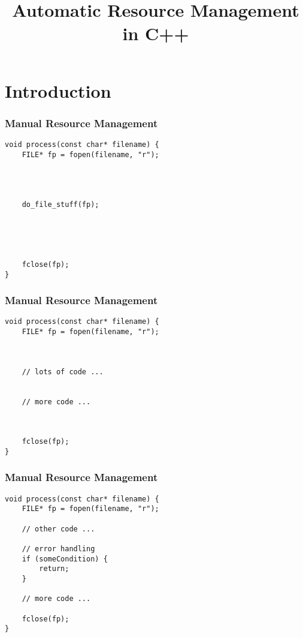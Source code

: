 


\title{Automatic Resource Management in C++}





\frame{\titlepage}

\section{Introduction}
\frame{\sectionpage}

\begin{frame}[fragile]
    \frametitle{Manual Resource Management}
    \begin{lstlisting}[title=See anything wrong?]
void process(const char* filename) {
    FILE* fp = fopen(filename, "r");




    do_file_stuff(fp);





    fclose(fp);
}
    \end{lstlisting}
\end{frame}

\begin{frame}[fragile]
    \frametitle{Manual Resource Management}
    \begin{lstlisting}[title=See anything wrong?]
void process(const char* filename) {
    FILE* fp = fopen(filename, "r");



    // lots of code ...


    // more code ...



    fclose(fp);
}
    \end{lstlisting}
\end{frame}

\begin{frame}[fragile]
    \frametitle{Manual Resource Management}
    \begin{lstlisting}[title=Forgetting to close!]
void process(const char* filename) {
    FILE* fp = fopen(filename, "r");

    // other code ...

    // error handling
    if (someCondition) {
        return;
    }

    // more code ...

    fclose(fp);
}
    \end{lstlisting}
\end{frame}

